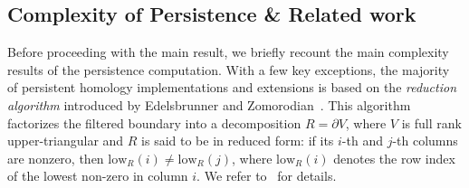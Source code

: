 \documentclass[10pt]{article}
\numberwithin{equation}{section}
\newcommand{\+}{%
	\raisebox{0.18ex}{\scaleobj{0.55}{+}}
}
\theoremstyle{definition}
\begin{document}

\subsection{Complexity of Persistence \& Related work}
Before proceeding with the main result, we briefly recount the main complexity results of the persistence computation. 
With a few key exceptions, the majority of persistent homology implementations and extensions is based on the \emph{reduction algorithm} introduced by Edelsbrunner and Zomorodian~\cite{edelsbrunner2000topological}. 
This algorithm factorizes the filtered boundary into a decomposition $R = \partial V$, where $V$ is full rank upper-triangular and $R$ is said to be in reduced form: if its $i$-th and $j$-th columns are nonzero, then $\mathrm{low}_R(i) \neq \mathrm{low}_R(j)$, where $\mathrm{low}_R(i)$ denotes the row index of the lowest non-zero in column $i$. 
We refer to~\cite{} for details. 
\end{document}
